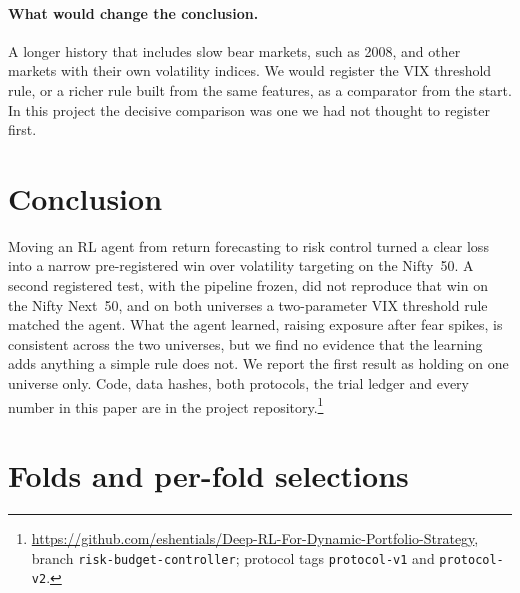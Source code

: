 \documentclass[11pt]{article}
\newcommand{\gtab}[1]{\begin{adjustbox}{max width=\linewidth}\end{adjustbox}}
\begin{document}
\paragraph{What would change the conclusion.} A longer history that includes slow bear markets, such as 2008, and other markets with their own volatility indices. We would register the VIX threshold rule, or a richer rule built from the same features, as a comparator from the start. In this project the decisive comparison was one we had not thought to register first.

\section{Conclusion}

Moving an RL agent from return forecasting to risk control turned a clear loss into a narrow pre-registered win over volatility targeting on the Nifty~50. A second registered test, with the pipeline frozen, did not reproduce that win on the Nifty Next~50, and on both universes a two-parameter VIX threshold rule matched the agent. What the agent learned, raising exposure after fear spikes, is consistent across the two universes, but we find no evidence that the learning adds anything a simple rule does not. We report the first result as holding on one universe only. Code, data hashes, both protocols, the trial ledger and every number in this paper are in the project repository.\footnote{\url{https://github.com/eshentials/Deep-RL-For-Dynamic-Portfolio-Strategy}, branch \texttt{risk-budget-controller}; protocol tags \texttt{protocol-v1} and \texttt{protocol-v2}.}





\appendix

\section{Folds and per-fold selections}\label{app:folds}

\begin{table}[H]
\centering\small
\caption{Study~1 walk-forward folds. The PPO column is the mean over five seeds of the best validation Sharpe ratio. Volatility targeting, the best fixed action and the post-hoc VIX rule were each chosen on the same validation years. $^\dagger$Previously seen.}
\gtab{tab_folds.tex}
\end{table}
\end{document}
